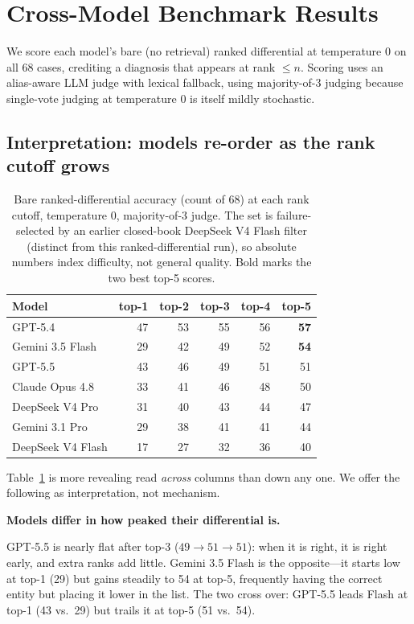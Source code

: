 \documentclass{article}
\renewcommand{\paragraph}[1]{%
  \par\addvspace{0.42\baselineskip}%
  \noindent\textbf{#1}\par\nobreak\vspace{-0.28\baselineskip}%
}
\begin{document}
\section{Cross-Model Benchmark Results}\label{sec:cross}

We score each model's bare (no retrieval) ranked differential at temperature 0 on all 68 cases, crediting a
diagnosis that appears at rank $\le n$. Scoring uses an alias-aware LLM judge with lexical fallback, using
majority-of-3 judging because single-vote judging at temperature 0 is itself mildly stochastic.

\subsection{Interpretation: models re-order as the rank cutoff grows}

\begin{table}[H]
\centering
\begin{tabular}{lrrrrr}
\toprule
Model & top-1 & top-2 & top-3 & top-4 & top-5 \\
\midrule
GPT-5.4            & 47 & 53 & 55 & 56 & \textbf{57} \\
Gemini 3.5 Flash   & 29 & 42 & 49 & 52 & \textbf{54} \\
GPT-5.5            & 43 & 46 & 49 & 51 & 51 \\
Claude Opus 4.8    & 33 & 41 & 46 & 48 & 50 \\
DeepSeek V4 Pro    & 31 & 40 & 43 & 44 & 47 \\
Gemini 3.1 Pro     & 29 & 38 & 41 & 41 & 44 \\
DeepSeek V4 Flash  & 17 & 27 & 32 & 36 & 40 \\
\bottomrule
\end{tabular}
\caption{Bare ranked-differential accuracy (count of 68) at each rank cutoff, temperature 0, majority-of-3
judge. The set is failure-selected by an earlier closed-book DeepSeek V4 Flash filter (distinct from this
ranked-differential run), so absolute numbers index difficulty, not general quality. Bold marks the two best
top-5 scores.}
\label{tab:bare}
\end{table}

Table~\ref{tab:bare} is more revealing read \emph{across} columns than down any one. We offer the following
as interpretation, not mechanism.

\paragraph{Models differ in how peaked their differential is.} GPT-5.5 is nearly flat after top-3
($49\to51\to51$): when it is right, it is right early, and extra ranks add little. Gemini 3.5 Flash is the
opposite---it starts low at top-1 (29) but gains steadily to 54 at top-5, frequently having the correct
entity but placing it lower in the list. The two cross over: GPT-5.5 leads Flash at top-1 (43 vs.\ 29) but
trails it at top-5 (51 vs.\ 54).
\end{document}
